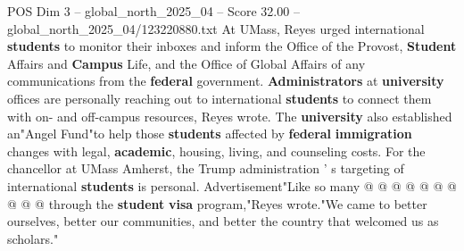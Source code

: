 \begin{textsample}{POS Dim 3 – global\_north\_2025\_04 – Score 32.00 – global\_north\_2025\_04/123220880.txt}
At UMass, Reyes urged international \textbf{students} to monitor their inboxes and inform the Office of the Provost, \textbf{Student} Affairs and \textbf{Campus} Life, and the Office of Global Affairs of any communications from the \textbf{federal} government. \textbf{Administrators} at \textbf{university} offices are personally reaching out to international \textbf{students} to connect them with on- and off-campus resources, Reyes wrote.
The \textbf{university} also established an"Angel Fund"to help those \textbf{students} affected by \textbf{federal} \textbf{immigration} changes with legal, \textbf{academic}, housing, living, and counseling costs.
For the chancellor at UMass Amherst, the Trump administration ' s targeting of international \textbf{students} is personal.
Advertisement"Like so many @ @ @ @ @ @ @ @ @ @ through the \textbf{student} \textbf{visa} program,"Reyes wrote."We came to better ourselves, better our communities, and better the country that welcomed us as scholars."

\end{textsample}
